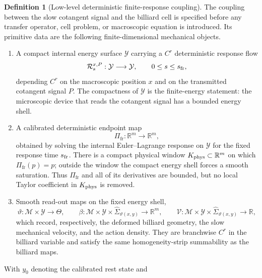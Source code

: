 \documentclass[12pt, letterpaper]{amsart}
\newcommand{\Mcal}{\mathcal{M}}
\newcommand{\R}{\mathbb{R}}
\newcommand{\Thetacal}{\Theta}
\newcommand{\Pifr}{\Pi_{\mathrm{fr}}}
\theoremstyle{plain}
\theoremstyle{definition}
\newtheorem{definition}[theorem]{Definition}
\theoremstyle{remark}
\begin{document}
\begin{definition}[Low-level deterministic finite-response coupling]
\label{def:finite_response_coupling}
The coupling between the slow cotangent signal and the billiard cell is specified
before any transfer operator, cell problem, or macroscopic equation is
introduced.  Its primitive data are the following finite-dimensional mechanical
objects.
\begin{enumerate}[label=(M\arabic*), wide, labelindent=0pt]
    \item A compact internal energy surface $\mathcal Y$ carrying a $C^r$
    deterministic response flow
    \begin{equation}
        \mathcal R_s^{x,P}:\mathcal Y\longrightarrow\mathcal Y,
        \qquad 0\le s\le s_{\rm fr},
    \end{equation}
    depending $C^r$ on the macroscopic position $x$ and on the transmitted
    cotangent signal $P$.  The compactness of $\mathcal Y$ is the finite-energy
    statement: the microscopic device that reads the cotangent signal has a
    bounded energy shell.
    \item A calibrated deterministic endpoint map
    \begin{equation}
        \Pifr:\R^m\longrightarrow\R^m,
    \end{equation}
    obtained by solving the internal Euler--Lagrange response on
    $\mathcal Y$ for the fixed response time $s_{\rm fr}$.  There is a compact
    physical window $K_{\rm phys}\subset\R^m$ on which $\Pifr(p)=p$; outside the
    window the compact energy shell forces a smooth saturation.  Thus $\Pifr$
    and all of its derivatives are bounded, but no local Taylor coefficient in
    $K_{\rm phys}$ is removed.
    \item Smooth read-out maps on the fixed energy shell,
    \begin{equation}
        \vartheta:\Mcal\times\mathcal Y\to\Thetacal,
        \qquad
        \beta:\Mcal\times\mathcal Y\times\widehat\Sigma_{\vartheta(x,y)}\to\R^m,
        \qquad
        \mathcal V:\Mcal\times\mathcal Y\times\widehat\Sigma_{\vartheta(x,y)}\to\R,
    \end{equation}
    which record, respectively, the deformed billiard geometry, the slow
    mechanical velocity, and the action density.  They are branchwise $C^r$ in
    the billiard variable and satisfy the same homogeneity-strip summability as
    the billiard maps.
\end{enumerate}
With $y_0$ denoting the calibrated rest state and

\end{definition}
\end{document}
